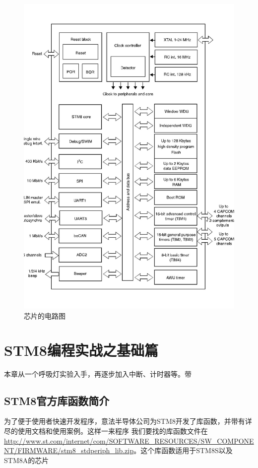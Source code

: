\documentclass[a4paper]{book}
\newcommand{\chap}[1]{\newpage\thispagestyle{empty}\chapter{#1}\label{chap:\thechapter}}
\begin{document}
\begin{figure}[htbp]
\centering
\includegraphics{figures/circuit_diagram.jpg}
\caption{芯片的电路图}
\end{figure}

\chap{STM8编程实战之基础篇}

本章从一个呼吸灯实验入手，再逐步加入中断、计时器等。带

\section{STM8官方库函数简介}

为了便于使用者快速开发程序，意法半导体公司为STM8开发了库函数，并带有详尽的使用文档和使用案例。这样一来程序 我们要找的库函数文件在\url{http://www.st.com/internet/com/SOFTWARE_RESOURCES/SW_COMPONENT/FIRMWARE/stm8_stdperiph_lib.zip}。这个库函数适用于STM8S以及STM8A的芯片
\end{document}
